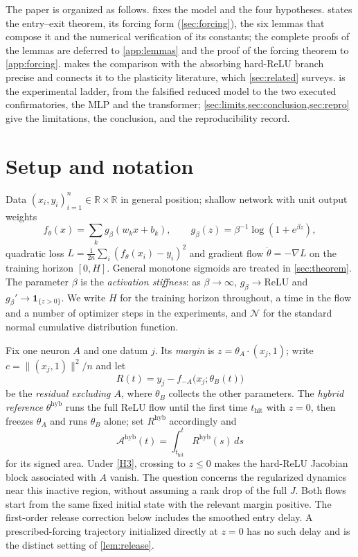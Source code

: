 \documentclass[11pt]{article}
\theoremstyle{definition}
\theoremstyle{remark}
\newcommand{\R}{\mathbb{R}}
\newcommand{\thit}{t_{\mathrm{hit}}}
\newcommand{\Ar}{\mathcal{A}}                      %
\newcommand{\hyb}{\mathrm{hyb}}
\begin{document}
The paper is organized as follows.  fixes the model and the four
hypotheses.  states the entry--exit theorem, its forcing
form (\cref{sec:forcing}), the six lemmas
that compose it and the numerical verification of its constants; the complete
proofs of the lemmas are deferred to \cref{app:lemmas} and the proof of the
forcing theorem to \cref{app:forcing}.  makes
the comparison with the absorbing hard-ReLU branch precise and connects it to the
plasticity literature, which \cref{sec:related} surveys. 
is the experimental ladder, from the falsified reduced model to the two executed
confirmatories, the MLP and the transformer;
\cref{sec:limits,sec:conclusion,sec:repro} give
the limitations, the conclusion, and the reproducibility record.

\section{Setup and notation}\label{sec:setup}

Data $(x_i,y_i)_{i=1}^n\in\R\times\R$ in general position; shallow network with
unit output weights
\begin{equation}\label{eq:net}
f_\theta(x)=\sum_{k} g_\beta(w_kx+b_k),
\qquad
g_\beta(z)=\beta^{-1}\log(1+e^{\beta z}),
\end{equation}
quadratic loss $L=\tfrac1{2n}\sum_i(f_\theta(x_i)-y_i)^2$ and gradient flow
$\dot\theta=-\nabla L$ on the training horizon $[0,H]$. General monotone sigmoids
are treated in \cref{sec:theorem}. The parameter $\beta$ is the
\emph{activation stiffness}: as $\beta\to\infty$, $g_\beta\to\mathrm{ReLU}$ and
$g_\beta'\to\mathbf 1_{\{z>0\}}$. We write $H$ for the training horizon
throughout, a time in the flow and a number of optimizer steps in the
experiments, and $\mathcal N$ for the standard normal cumulative distribution
function.

Fix one neuron $A$ and one datum $j$. Its \emph{margin} is
$z=\theta_A\cdot(x_j,1)$; write $c=\|(x_j,1)\|^2/n$ and let
\begin{equation}\label{eq:residual}
R(t)=y_j-f_{-A}\bigl(x_j;\theta_B(t)\bigr)
\end{equation}
be the \emph{residual excluding $A$}, where $\theta_B$ collects the other
parameters. The \emph{hybrid reference} $\theta^{\hyb}$ runs the full ReLU flow
until the first time $\thit$ with $z=0$, then freezes $\theta_A$ and runs
$\theta_B$ alone; set $R^{\hyb}$ accordingly and
\begin{equation}\label{eq:area}
\Ar^{\hyb}(t)=\int_{\thit}^{t}R^{\hyb}(s)\,ds
\end{equation}
for its signed area. Under \eqref{H3}, crossing to $z\le0$ makes the hard-ReLU Jacobian block
associated with $A$ vanish. The question concerns the regularized dynamics
near this inactive region, without assuming a rank drop of the full $J$.
Both flows start from the same fixed initial state with the relevant margin
positive. The first-order release correction below includes the smoothed
entry delay. A prescribed-forcing trajectory initialized directly at $z=0$
has no such delay and is the distinct setting of \cref{lem:release}.
\end{document}
